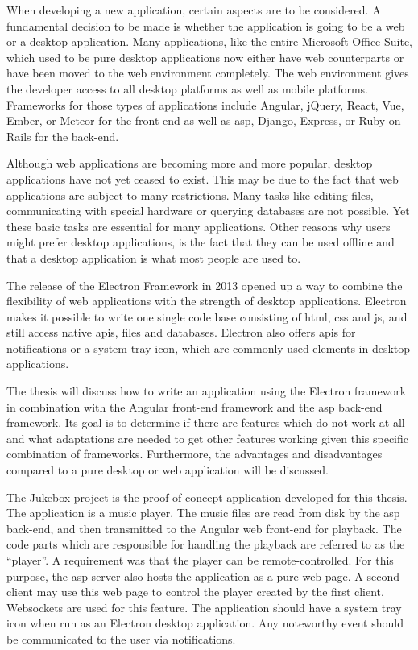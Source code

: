 
When developing a new application, certain aspects are to be considered. A fundamental decision to be made is whether the application is going to be a web or a desktop application. Many applications, like the entire Microsoft Office Suite, which used to be pure desktop applications now either have web counterparts or have been moved to the web environment completely. The web environment gives the developer access to all desktop platforms as well as mobile platforms. Frameworks for those types of applications include Angular, jQuery, React, Vue, Ember, or Meteor for the front-end as well as \gls{asp}, Django, Express, or Ruby on Rails for the back-end.

Although web applications are becoming more and more popular, desktop applications have not yet ceased to exist. This may be due to the fact that web applications are subject to many restrictions. Many tasks like editing files, communicating with special hardware or querying databases are not possible. Yet these basic tasks are essential for many applications. Other reasons why users might prefer desktop applications, is the fact that they can be used offline and that a desktop application is what most people are used to.

The release of the Electron Framework in 2013 opened up a way to combine the flexibility of web applications with the strength of desktop applications. Electron makes it possible to write one single code base consisting of \gls{html}, \gls{css} and \gls{js}, and still access native \glspl{api}, files and databases. Electron also offers \glspl{api} for notifications or a system tray icon, which are commonly used elements in desktop applications.

The thesis will discuss how to write an application using the Electron framework in combination with the Angular front-end framework and the \gls{asp} back-end framework. Its goal is to determine if there are features which do not work at all and what adaptations are needed to get other features working given this specific combination of frameworks. Furthermore, the advantages and disadvantages compared to a pure desktop or web application will be discussed.


The Jukebox project is the proof-of-concept application developed for this thesis. The application is a music player. The music files are read from disk by the \gls{asp} back-end, and then transmitted to the Angular web front-end for playback. The code parts which are responsible for handling the playback are referred to as the \enquote{player}. A requirement was that the player can be remote-controlled. For this purpose, the \gls{asp} server also hosts the application as a pure web page. A second client may use this web page to control the player created by the first client. Websockets are used for this feature. The application should have a system tray icon when run as an Electron desktop application. Any noteworthy event should be communicated to the user via notifications.

